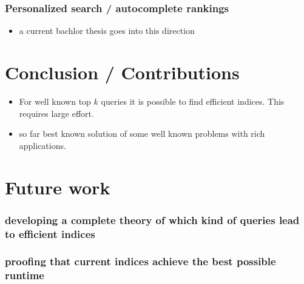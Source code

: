 \documentclass[•]{article}
\begin{document}
\subsubsection{Personalized search / autocomplete rankings}
\begin{itemize}
\item a current bachlor thesis goes into this direction
\end {itemize}

\pagebreak
\section{Conclusion / Contributions}
\begin{itemize}
\item For well known top $k$ queries it is possible to find efficient indices. This requires large effort. 
\item so far best known solution of some well known problems with rich applications. 
\end{itemize}
\section{Future work}
\subsubsection{developing a complete theory of which kind of queries lead to efficient indices}
\subsubsection{proofing that current indices achieve the best possible runtime}



\end{document}
